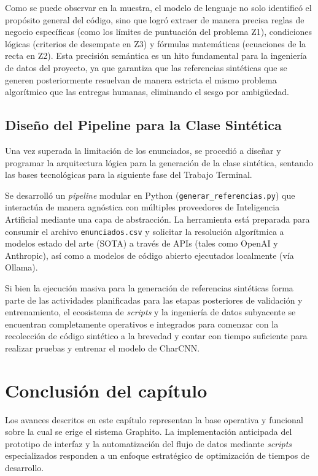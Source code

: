 Como se puede observar en la muestra, el modelo de lenguaje no solo identificó el propósito general del código, sino que logró extraer de manera precisa reglas de negocio específicas (como los límites de puntuación del problema Z1), condiciones lógicas (criterios de desempate en Z3) y fórmulas matemáticas (ecuaciones de la recta en Z2). Esta precisión semántica es un hito fundamental para la ingeniería de datos del proyecto, ya que garantiza que las referencias sintéticas que se generen posteriormente resuelvan de manera estricta el mismo problema algorítmico que las entregas humanas, eliminando el sesgo por ambigüedad.
\subsection{Diseño del Pipeline para la Clase Sintética}

Una vez superada la limitación de los enunciados, se procedió a diseñar y programar la arquitectura lógica para la generación de la clase sintética, sentando las bases tecnológicas para la siguiente fase del Trabajo Terminal.

Se desarrolló un \textit{pipeline} modular en Python (\texttt{generar\_referencias.py}) que interactúa de manera agnóstica con múltiples proveedores de Inteligencia Artificial mediante una capa de abstracción. La herramienta está preparada para consumir el archivo \texttt{enunciados.csv} y solicitar la resolución algorítmica a modelos estado del arte (SOTA) a través de APIs (tales como OpenAI y Anthropic), así como a modelos de código abierto ejecutados localmente (vía Ollama). 

Si bien la ejecución masiva para la generación de referencias sintéticas forma parte de las actividades planificadas para las etapas posteriores de validación y entrenamiento, el ecosistema de \textit{scripts} y la ingeniería de datos subyacente se encuentran completamente operativos e integrados para comenzar con la recolección de código sintético a la brevedad y contar con tiempo suficiente para realizar pruebas y entrenar el modelo de CharCNN.

\section{Conclusión del capítulo}

Los avances descritos en este capítulo representan la base operativa y funcional sobre la cual se erige el sistema Graphito. La implementación anticipada del prototipo de interfaz y la automatización del flujo de datos mediante \textit{scripts} especializados responden a un enfoque estratégico de optimización de tiempos de desarrollo. 

